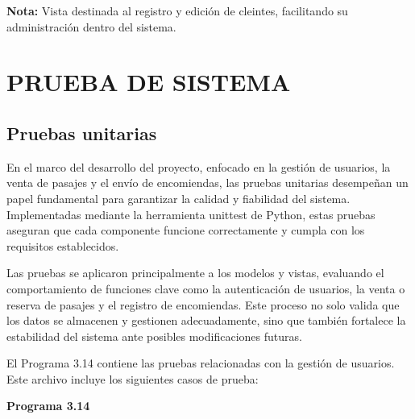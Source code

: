 	\textbf{Nota:} Vista destinada al registro y edición de cleintes, facilitando su administración dentro del sistema.	
	
\section{PRUEBA DE SISTEMA}
	\subsection{Pruebas unitarias}
	
	En el marco del desarrollo del proyecto, enfocado en la gestión de usuarios, la venta de pasajes y el envío de encomiendas, las pruebas unitarias desempeñan un papel fundamental para garantizar la calidad y fiabilidad del sistema. Implementadas mediante la herramienta unittest de Python, estas pruebas aseguran que cada componente funcione correctamente y cumpla con los requisitos establecidos.
	
	Las pruebas se aplicaron principalmente a los modelos y vistas, evaluando el comportamiento de funciones clave como la autenticación de usuarios, la venta o reserva de pasajes y el registro de encomiendas. Este proceso no solo valida que los datos se almacenen y gestionen adecuadamente, sino que también fortalece la estabilidad del sistema ante posibles modificaciones futuras.
	
	El Programa 3.14 contiene las pruebas relacionadas con la gestión de usuarios. Este archivo incluye los siguientes casos de prueba:
	
	\textbf{Programa 3.14}
	
